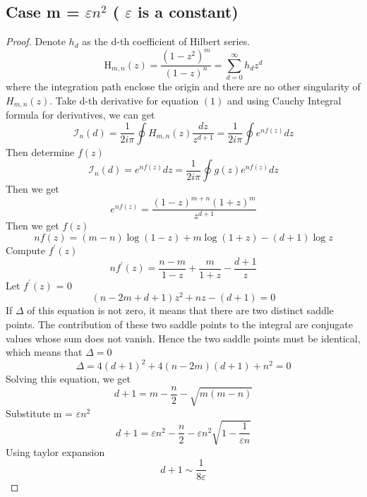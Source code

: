 \documentclass[a4paper]{article}
\theoremstyle{definition}
\theoremstyle{remark}
\renewcommand{\epsilon}{\varepsilon}
\begin{document}
\subsection{Case m = $\epsilon$$n^{2}$ ( $\epsilon$ is a constant)}
\begin{proof}
Denote $h_{d}$ as the d-th coefficient of Hilbert series.\\
\begin{equation}  \mathrm {H}_{m,n} ( z ) = \frac { \left( 1 - z ^ { 2 } \right) ^ { m } } { ( 1 - z ) ^ { n } } = \sum _ { d = 0 } ^ { \infty } h _ { d } z ^ { d } \end{equation}
where the integration path enclose the origin and there are no other singularity of $H_{m,n}(z)$.
Take d-th derivative for equation $(1)$ and using Cauchy Integral formula for derivatives, we can get
\begin{equation} \mathcal { I } _ { n } ( d )  = \frac { 1 } { 2i \pi } \oint H _ { m , n } ( z ) \frac { d z } { z ^ { d + 1 } } = \frac { 1 } { 2i \pi } \oint e ^ { n f ( z ) } d z \end{equation}
Then determine $f(z)$
\begin{equation} 
\mathcal { I } _ { n } ( d ) = e ^ { n f ( z ) } d z = \frac { 1 } { 2 i \pi } \oint g ( z ) e ^ { n f ( z ) } d z
\end{equation}
Then we get
\begin{equation} 
e ^ { n f ( z ) } = \frac { ( 1 - z ) ^ { m + n } ( 1 + z ) ^ { m } } { z ^ { d + 1 } }
\end{equation}
Then we get $f(z)$
\begin{equation} 
n f ( z ) = ( m - n ) \log ( 1 - z ) + m \log ( 1 + z ) - ( d + 1 ) \log z
\end{equation}
Compute $f ^ { \prime } ( z )$
\begin{equation} 
n f ^ { \prime } ( z ) = \frac { n - m } { 1 - z } + \frac { m } { 1 + z } - \frac { d + 1 } { z }
\end{equation}
Let $f ^ { \prime } ( z )$ = 0
\begin{equation}
( n - 2 m + d + 1 ) z ^ { 2 } + n z - ( d + 1 ) = 0
\end{equation}
If $\Delta$ of this equation is not zero, it means that there are two distinct saddle points. The contribution of these two saddle points to the integral are conjugate values whose sum does not vanish. Hence the two saddle points must be identical, which means that $\Delta = 0$
\begin{equation}
\Delta = 4 ( d + 1 ) ^ { 2 } + 4 ( n - 2 m ) ( d + 1 ) + n ^ { 2 } = 0
\end{equation}
Solving this equation, we get 
\begin{equation}
d + 1 = m - \frac { n } { 2 } - \sqrt { m ( m - n ) }
\end{equation}
Substitute m = $\epsilon$$n^{2}$
\begin{equation}
d + 1  = \epsilon n ^ { 2 } - \frac { n } { 2 } - \epsilon n ^ { 2 } \sqrt { 1 - \frac { 1 }{ \epsilon n } }
\end{equation}
Using taylor expansion
\begin{equation}
d+1 \sim \frac{1}{8\epsilon}
\end{equation}
\end{proof}
\end{document}
